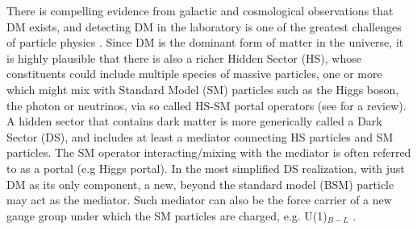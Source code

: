 There is compelling evidence from galactic and cosmological observations that DM exists, and detecting DM in the laboratory is one of the greatest challenges of particle physics \cite{bertone:2004pz}. Since DM is the dominant form of matter in the universe, it is highly plausible that there is also a richer 
Hidden Sector (HS), 
whose constituents could include multiple species of massive particles, one or more which might mix with Standard Model (SM) particles such as the Higgs boson, the photon or neutrinos, via so called HS-SM portal operators (see \cite{Battaglieri:2017aum} for
a review).
A hidden sector that contains dark matter is more generically called a Dark Sector (DS), and includes at least a  mediator connecting  HS particles and SM particles. The SM operator interacting/mixing with the mediator is often referred to as a portal (e.g Higgs portal).
In the most simplified  DS realization, with just  DM as its only component, a new, beyond the standard model (BSM) particle may act as the mediator.
Such mediator can also be the force carrier of a new gauge group under which the
SM particles are charged, e.g. U(1)$_{B-L}$ \cite{Ilten:2018crw,Bauer:2018onh}.





